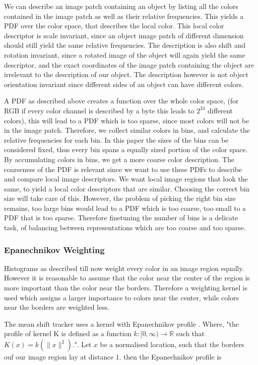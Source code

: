 \documentclass[a4paper,11pt]{article}
\begin{document}
We can describe an image patch containing an object by listing all the colors contained in the image patch as well as their relative frequencies. This yields a PDF over the color space, that describes the local color. This local color descriptor is scale invariant, since an object image patch of different dimension should still yield the same relative frequencies. The description is also shift and rotation invariant, since a rotated image of the object will again yield the same descriptor, and the exact coordinates of the image patch containing the object are irrelevant to the description of our object. The description however is not object orientation invariant since different sides of an object can have different colors. 

A PDF as described above creates a function over the whole color space, (for RGB if every color channel is described by a byte this leads to $2^{24}$ different colors), this will lead to a PDF which is too sparse, since most colors will not be in the image patch. Therefore, we collect similar colors in bins, and calculate the relative frequencies for each bin. In this paper the sizes of the bins can be considered fixed, thus every bin spans a equally sized portion of the color space. By accumulating colors in bins, we get a more coarse color description. The coarseness of the PDF is relevant since we want to use these PDFs to describe and compare local image descriptors. We want local image regions that look the same, to yield a local color descriptors that are similar.  Choosing the correct bin size will take care of this. However, the problem of picking the right bin size remains, too large bins would lead to a PDF which is too coarse, too small to a PDF that is too sparse. Therefore finetuning the number of bins is a delicate task, of balancing between representations which are too coarse and too sparse.  

\subsubsection{Epanechnikov Weighting}
Histograms as described till now weight every color in an image region equally. However it is reasonable to assume that the color near the center of the region is more important than the color near the borders. Therefore a weighting kernel is used which assigns a larger importance to colors near the center, while colors near the borders are weighted less. 

The mean shift tracker uses a kernel with Epanechnikov profile \cite{mean_shift_epan}. Where, "the profile of kernel K is defined as a function $k:[0,\infty)\rightarrow\mathds{R}$ such that $K(x)=k(\|x\|^2)$."\cite{mean_shift}.
Let $x$ be a normalised location, such that the borders ouf our image region lay at distance 1. then the Epanechnikov profile is
\end{document}
